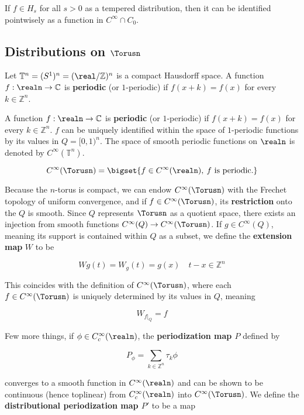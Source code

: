 If \(f\in H_s\) for all \(s>0\) as a tempered distribution, then it can
be identified pointwisely as a function in \(C^\infty\cap C_0\).

\hypertarget{distributions-on-torusn}{%
\subsection{\texorpdfstring{Distributions on
\(\Torusn\)}{Distributions on \textbackslash Torusn}}\label{distributions-on-torusn}}

Let \(\mathbb{T}^n = (S^1)^n = (\real/\mathbb{Z})^n\) is a compact
Hausdorff space. A function \(f: \realn\to\mathbb{C}\) is
\textbf{periodic} (or \(1\)-periodic) if \(f(x+k) = f(x)\) for every
\(k\in\mathbb{Z}^n\).

A function \(f: \realn\to\mathbb{C}\) is \textbf{periodic} (or
\(1\)-periodic) if \(f(x+k) = f(x)\) for every \(k\in\mathbb{Z}^n\).
\(f\) can be uniquely identified within the space of \(1\)-periodic
functions by its values in \(Q=[0,1)^n\). The space of smooth periodic
functions on \(\realn\) is denoted by \(C^\infty(\mathbb{T}^n)\).

\[
C^\infty(\Torusn) = \bigset{f\in C^\infty(\realn),\: f\text{ is periodic.}}
\]

Because the \(n\)-torus is compact, we can endow \(C^\infty(\Torusn)\)
with the Frechet topology of uniform convergence, and if
\(f\in C^\infty(\Torusn)\), its \textbf{restriction} onto the \(Q\) is
smooth. Since \(Q\) represents \(\Torusn\) as a quotient space, there
exists an injection from smooth functions
\(C^\infty(Q)\to C^\infty(\Torusn)\). If \(g\in C^\infty(Q)\), meaning
its support is contained within \(Q\) as a subset, we define the
\textbf{extension map} \(W\) to be

\[
Wg(t) = W_g(t) = g(x)\quad t-x\in\mathbb{Z}^n
\]

This coincides with the definition of \(C^\infty(\Torusn)\), where each
\(f\in C^\infty(\Torusn)\) is uniquely determined by its values in
\(Q\), meaning

\[
W_{f\vert_{Q}} = f
\]

Few more things, if \(\phi\in C_c^\infty(\realn)\), the
\textbf{periodization map \(P\)} defined by

\[
P_\phi = \sum_{k\in\mathbb{Z}^n}\tau_k\phi
\]

converges to a smooth function in \(C^\infty(\realn)\) and can be shown
to be continuous (hence toplinear) from \(C_c^\infty(\realn)\) into
\(C^\infty(\Torusn)\). We define the \textbf{distributional
periodization map \(P'\)} to be a map

